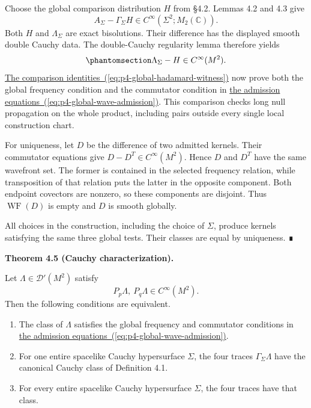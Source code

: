 \documentclass[
  english,
  11pt,
  reqno]{amsart}
\makeatletter
\providecommand{\tightlist}{%
  \setlength{\itemsep}{0pt}\setlength{\parskip}{0pt}}
\newcommand{\pandocstatementheading}[1]{%
  \par\if@nobreak\else
    \addpenalty{\@beginparpenalty}%
    \addvspace{.5\baselineskip plus .2\baselineskip minus .2\baselineskip}%
  \fi
  {\normalfont\bfseries #1\par}%
  \nobreak\@afterindenttrue\@afterheading
}
\makeatother
\begin{document}
Choose the global comparison distribution \(H\) from §4.2. Lemmas 4.2
and 4.3 give \[
A_\Sigma-\Gamma_\Sigma H\in C^\infty(\Sigma^2;M_2(\mathbb C)).
\] Both \(H\) and \(\Lambda_\Sigma\) are exact bisolutions. Their
difference has the displayed smooth double Cauchy data. The
double-Cauchy regularity lemma therefore yields
\begin{equation}\protect\phantomsection\label{eq:p4-construction-witness-smoothing}{
\Lambda_\Sigma-H\in C^\infty(M^2).
}\end{equation} \hyperref[eq:p4-global-hadamard-witness]{The comparison
identities~(\ref*{eq:p4-global-hadamard-witness})} now prove both the global frequency condition and the
commutator condition in \hyperref[eq:p4-global-wave-admission]{the
admission equations~(\ref*{eq:p4-global-wave-admission})}. This comparison checks long null propagation on
the whole product, including pairs outside every single local
construction chart.

For uniqueness, let \(D\) be the difference of two admitted kernels.
Their commutator equations give \(D-D^T\in C^\infty(M^2)\). Hence \(D\)
and \(D^T\) have the same wavefront set. The former is contained in the
selected frequency relation, while transposition of that relation puts
the latter in the opposite component. Both endpoint covectors are
nonzero, so these components are disjoint. Thus \(\operatorname{WF}(D)\)
is empty and \(D\) is smooth globally.

All choices in the construction, including the choice of \(\Sigma\),
produce kernels satisfying the same three global tests. Their classes
are equal by uniqueness. ∎

\pandocstatementheading{\protect{}\label{thm:p4-global-cauchy-characterization}Theorem 4.5 (Cauchy characterization).}

Let \(\Lambda\in\mathcal D'(M^2)\) satisfy \[
P_p\Lambda,\ P_q\Lambda\in C^\infty(M^2).
\] Then the following conditions are equivalent.

\begin{enumerate}
\tightlist
\item
  The class of \(\Lambda\) satisfies the global frequency and commutator
  conditions in \hyperref[eq:p4-global-wave-admission]{the admission
  equations~(\ref*{eq:p4-global-wave-admission})}.
\item
  For one entire spacelike Cauchy hypersurface \(\Sigma\), the four
  traces \(\Gamma_\Sigma\Lambda\) have the canonical Cauchy class of
  Definition 4.1.
\item
  For every entire spacelike Cauchy hypersurface \(\Sigma\), the four
  traces have that class.
\end{enumerate}
\end{document}
